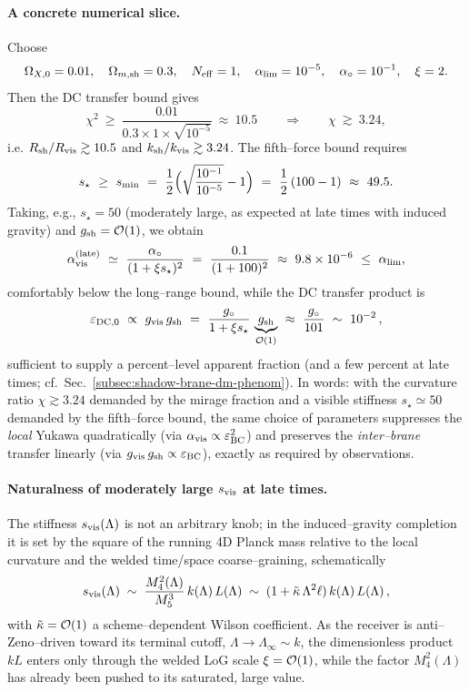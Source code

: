 \documentclass[10pt]{article}
\theoremstyle{definition}
\theoremstyle{plain}
\begin{document}
\paragraph{A concrete numerical slice.}\label{par:uom-main-106}
Choose
\[
\Omega_{X,0}=0.01,\quad \Omega_{m,{\rm sh}}=0.3,\quad N_{\rm eff}=1,\quad \alpha_{\rm lim}=10^{-5},\quad
\alpha_\circ=10^{-1},\quad \xi=2.
\]
Then the DC transfer bound gives
\[
\chi^2\ \ge\ \frac{0.01}{0.3\times 1\times \sqrt{10^{-5}}}\ \approx\ 10.5\qquad\Longrightarrow\qquad \chi\ \gtrsim\ 3.24,
\]
i.e. \(R_{\rm sh}/R_{\rm vis}\gtrsim 10.5\) and \(k_{\rm sh}/k_{\rm vis}\gtrsim 3.24\). The fifth–force bound requires
\[
s_\star\ \ge\ s_{\rm min}\ =\ \frac{1}{2}\Big(\sqrt{\frac{10^{-1}}{10^{-5}}}-1\Big)
\ =\ \frac{1}{2}\,(100-1)\ \approx\ 49.5.
\]
Taking, e.g., \(s_\star=50\) (moderately large, as expected at late times with induced gravity) and
\(g_{\rm sh}=\mathcal O(1)\), we obtain
\[
\alpha_{\rm vis}^{\rm (late)}\ \simeq\ \frac{\alpha_\circ}{(1+ \xi s_\star)^2}
\ =\ \frac{0.1}{(1+100)^2}\ \approx\ 9.8\times 10^{-6}\ \le\ \alpha_{\rm lim},
\]
comfortably below the long–range bound, while the DC transfer product is
\[
\varepsilon_{\rm DC,0}\ \propto\ g_{\rm vis}\,g_{\rm sh}
\ =\ \frac{g_\circ}{1+\xi s_\star}\,\underbrace{g_{\rm sh}}_{\mathcal O(1)}
\ \approx\ \frac{g_\circ}{101}\ \sim\ 10^{-2}\,,
\]
sufficient to supply a percent–level apparent fraction (and a few percent at late times; cf.\ Sec.~\ref{subsec:shadow-brane-dm-phenom}).
In words: with the curvature ratio \(\chi\gtrsim 3.24\) demanded by the mirage fraction and a visible stiffness
\(s_\star\simeq 50\) demanded by the fifth–force bound, the same choice of parameters suppresses the \emph{local} Yukawa
quadratically (via \(\alpha_{\rm vis}\propto \varepsilon_{\rm BC}^2\)) and preserves the \emph{inter–brane} transfer linearly
(via \(g_{\rm vis}\,g_{\rm sh}\propto \varepsilon_{\rm BC}\)), exactly as required by observations.


\paragraph{Naturalness of moderately large \(s_{\rm vis}\) at late times.}\label{par:uom-main-107}
The stiffness $s_{\rm vis}(\Lambda)$ is not an arbitrary knob; in the induced–gravity completion it is set by the square of the running 4D Planck mass relative to the local curvature and the welded time/space coarse–graining,
schematically
\[
s_{\rm vis}(\Lambda)\;\sim\;\frac{M_4^2(\Lambda)}{M_5^3}\,k(\Lambda)\,L(\Lambda)\;\sim\;(1+\tilde\kappa\,\Lambda^2\ell)\,k(\Lambda)\,L(\Lambda)\,,
\]
with \(\tilde\kappa={\cal O}(1)\) a scheme–dependent Wilson coefficient. As the receiver is anti–Zeno–driven toward its terminal cutoff, \(\Lambda\to\Lambda_\infty\sim k\), the dimensionless product \(kL\) enters only through the welded LoG scale \(\xi={\cal O}(1)\), while the factor \(M_4^2(\Lambda)\) has already been pushed to its saturated, large value. 
\end{document}
